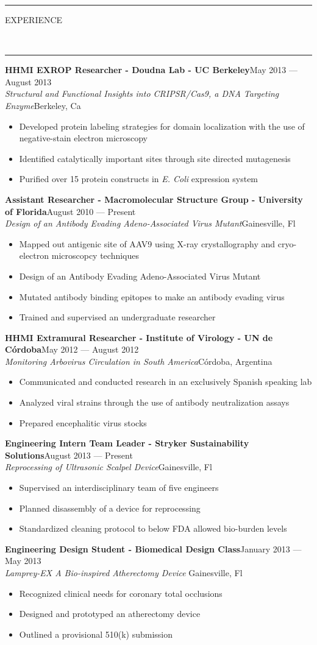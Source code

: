 \documentclass[10pt, letterpaper, oneside]{article}
\newcommand{\HRule}[2]{\textcolor{#1}{\rule{\linewidth}{#2}}}
\newcommand{\sectiontitle}[1]{\begin{minipage}{\textwidth}\HRule{black}{0.25mm}\vspace{-10pt}\begin{center}\large\MakeUppercase{#1}\end{center}\end{minipage}\vspace{-5pt}\\\HRule{light-grey}{0.15mm}\vspace{\baselineskip}}
\newenvironment{ressection}[1]{
  \sectiontitle{#1}}
  {\vspace{-\baselineskip}}
\newcommand{\resitem}[1]{
    \vspace{2pt}
    \item \begin{flushleft} #1 \end{flushleft}
}
\newcommand{\resentryheader}[4]{
    \vspace{-5pt}
    \textbf{#1}\hspace{\stretch{1}}\textcolor{light-grey}{#3}\\
    \textit{#2}\hspace{\stretch{1}}\textcolor{light-grey}{#4}\\
}
\newenvironment{resentry}[4]{
  \begin{minipage}{\textwidth}
    \resentryheader{#1}{#2}{#3}{#4}
        \vspace{-\baselineskip}
    \begin{itemize}[noitemsep,nolistsep]
}{
    \end{itemize}
        \vspace{\baselineskip}
        \end{minipage}
}
\begin{document}
\vspace{-15pt}
\begin{ressection}{experience}
  

  \begin{resentry}{HHMI EXROP Researcher - Doudna Lab - UC Berkeley}{Structural and Functional Insights into CRIPSR/Cas9, a DNA Targeting Enzyme}{May 2013 --- August 2013}{Berkeley, Ca}
    \resitem{Developed protein labeling strategies for domain localization with the use of negative-stain electron microscopy}
    \resitem{Identified catalytically important sites  through site directed mutagenesis}
    \resitem{Purified over 15 protein constructs in \textit{E. Coli} expression system}
  \end{resentry}

  \begin{resentry}{Assistant Researcher - Macromolecular Structure Group - University of Florida}{Design of an Antibody Evading Adeno-Associated Virus Mutant}{August 2010 --- Present}{Gainesville, Fl}
	\resitem{Mapped out antigenic site of AAV9 using X-ray crystallography and cryo-electron microscopcy techniques}
    \resitem{Design of an Antibody Evading Adeno-Associated Virus Mutant}
    \resitem{Mutated antibody binding epitopes to make an antibody evading virus}
    \resitem{Trained and supervised an undergraduate researcher}
  \end{resentry}

  \begin{resentry}{HHMI Extramural Researcher - Institute of Virology - UN de C\'{o}rdoba}{Monitoring Arbovirus Circulation in South America}{May 2012 --- August 2012}{C\'{o}rdoba, Argentina}
    \resitem{Communicated and conducted research in an exclusively Spanish speaking lab}
    \resitem{Analyzed viral strains through the use of antibody neutralization assays }
	\resitem{Prepared encephalitic virus stocks}
  \end{resentry}

\begin{resentry}{Engineering Intern Team Leader - Stryker Sustainability Solutions}{Reprocessing of Ultrasonic Scalpel Device}{August 2013 --- Present}{Gainesville, Fl}
    \resitem{Supervised an interdisciplinary team of five engineers}
    \resitem{Planned disassembly of a device for reprocessing}
    \resitem{Standardized cleaning protocol to below FDA allowed bio-burden levels }
  \end{resentry}

\begin{resentry}{Engineering Design Student - Biomedical Design Class}{Lamprey-EX A Bio-inspired Atherectomy Device }{January 2013 --- May 2013}{Gainesville, Fl}
    \resitem{Recognized clinical needs for coronary total occlusions}
    \resitem{Designed and prototyped an atherectomy device }
    \resitem{Outlined a provisional 510(k) submission}
  \end{resentry}
\end{ressection}
 
\end{document}
